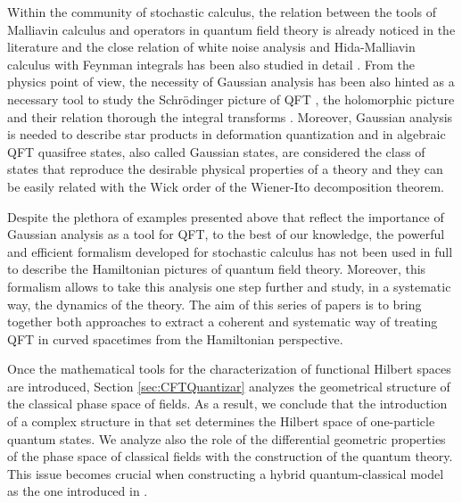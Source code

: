 \documentclass{elsarticle}%
\begin{document}
Within the community of stochastic calculus, the relation between the tools of Malliavin calculus and operators in quantum field theory is already noticed in the literature \cite{henry-labordereAnalysisGeometry2009} and  the close relation of white noise analysis and Hida-Malliavin calculus with Feynman integrals has been also studied  in detail \cite{hidaWhiteNoise1993,kuoWhiteNoise1996,westerkampRecentResults2003}.  From the physics point of view, the necessity of Gaussian analysis has been also hinted as a necessary tool to study the Schrödinger picture of QFT \cite{corichiSchrodingerFock2004, longSchrodingerWave1998,longSchrodingerWave1996, hofmannClassicalQuantum2015,hofmannNonGaussianGroundstate2017,hofmannQuantumComplete2019,eglseerQuantumPopulations2021}, the holomorphic picture \cite{oecklHolomorphicQuantization2012,oecklAffineHolomorphic2012} and their relation thorough the integral transforms \cite{oecklSchrodingerRepresentation2012}. Moreover, Gaussian analysis is needed to describe star products in  deformation quantization \cite{ditoStarproductApproach1990} and in algebraic QFT  quasifree states, also called Gaussian states,  are considered the class of states that reproduce the desirable physical properties of a theory \cite{brunettiAdvancesAlgebraic2015} and they can be easily related with the Wick order of the Wiener-Ito decomposition theorem.

Despite the plethora of examples presented above that reflect the importance of Gaussian analysis as a tool for QFT, to the best of our knowledge, the powerful and efficient formalism developed for  stochastic calculus has not been used in full to describe the Hamiltonian pictures of quantum field theory. Moreover, this formalism allows to take this analysis one step further and study, in a systematic way, the dynamics of the theory. The aim of this series of papers is to bring together both approaches to extract a coherent and systematic way  of treating QFT in curved spacetimes from the Hamiltonian perspective. 


Once the mathematical tools for the characterization of functional Hilbert spaces are introduced, Section  \ref{sec:CFTQuantizar} analyzes the geometrical structure of the classical phase space of fields. As a result, we conclude that the introduction of a complex structure in that set   determines the Hilbert space of one-particle quantum states. We analyze also the role of the differential geometric properties of the phase space of classical fields with the construction of the quantum theory. This issue becomes crucial when constructing a hybrid quantum-classical model as the one introduced in \cite{alonsobujHybridGeometrodynamics2024}. 
\end{document}
